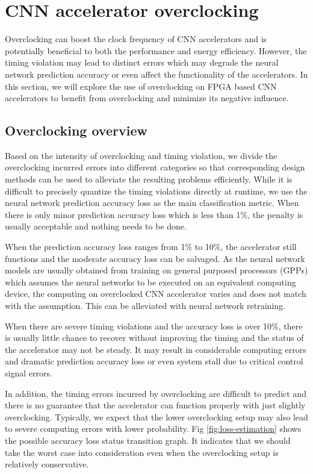 \section{CNN accelerator overclocking} \label{sec:framework}
Overclocking can boost the clock frequency of CNN accelerators and is potentially beneficial to both 
the performance and energy efficiency. However, the timing violation may lead to distinct errors which 
may degrade the neural network prediction accuracy or even affect the functionality of the accelerators. 
In this section, we will explore the use of overclocking on FPGA based CNN accelerators to benefit from 
overclocking and minimize its negative influence.

\subsection{Overclocking overview}
Based on the intensity of overclocking and timing 
violation, we divide the overclocking incurred errors into different 
categories so that corresponding design methods can be used to 
alleviate the resulting problems efficiently. While it is difficult 
to precisely quantize the timing violations directly at runtime, we use 
the neural network prediction accuracy loss as the main 
classification metric. When there is only minor prediction accuracy 
loss which is less than 1\%, the penalty is usually acceptable 
and nothing needs to be done. 

When the prediction accuracy loss ranges from 1\% to 10\%, the accelerator 
still functions and the moderate accuracy loss can be salvaged. 
As the neural network models are usually obtained 
from training on general purposed processors (GPPs) which assumes the 
neural networks to be executed on an equivalent computing device, 
the computing on overclocked CNN accelerator varies and does not match 
with the assumption. This can be alleviated with neural network retraining.

When there are severe timing violations and 
the accuracy loss is over 10\%, there is usually little chance to recover 
without improving the timing and the status of the accelerator 
may not be steady. It may result in considerable computing errors 
and dramatic prediction accuracy loss 
or even system stall due to critical control signal errors.  

In addition, the timing errors incurred by overclocking are difficult 
to predict and there is no guarantee that the accelerator can function properly 
with just slightly overclocking. Typically, we expect that the lower overclocking setup 
may also lead to severe computing errors with lower probability.
Fig \ref{fig:loss-estimation} shows the possible accuracy loss status 
transition graph. It indicates that we should take the worst case 
into consideration even when the overclocking setup is relatively
conservative.

